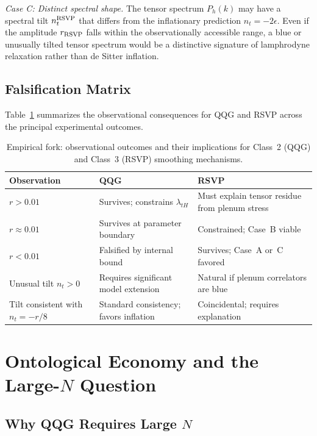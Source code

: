 \documentclass[12pt, a4paper]{article}
\newcommand{\rRSVP}{r_{\rm RSVP}}
\newcommand{\Ph}{P_h}
\begin{document}
\textit{Case C: Distinct spectral shape.} The tensor spectrum $\Ph(k)$ may have a
spectral tilt $n_t^{\rm RSVP}$ that differs from the inflationary prediction
$n_t = -2\epsilon$. Even if the amplitude $\rRSVP$ falls within the observationally
accessible range, a blue or unusually tilted tensor spectrum would be a distinctive
signature of lamphrodyne relaxation rather than de Sitter inflation.

\subsection{Falsification Matrix}

Table~\ref{tab:fork} summarizes the observational consequences for QQG and RSVP
across the principal experimental outcomes.

\begin{table}[h]
\centering
\caption{Empirical fork: observational outcomes and their implications for
Class~2 (QQG) and Class~3 (RSVP) smoothing mechanisms.}
\label{tab:fork}
\begin{tabular}{>{\raggedright}p{5cm} p{4cm} p{4cm}}
\toprule
\textbf{Observation} & \textbf{QQG} & \textbf{RSVP} \\
\midrule
$r > 0.01$ & Survives; constrains $\lambda_{tH}$ & Must explain tensor residue
from plenum stress \\[4pt]
$r \approx 0.01$ & Survives at parameter boundary & Constrained; Case~B viable \\[4pt]
$r < 0.01$ & Falsified by internal bound & Survives; Case~A or~C favored \\[4pt]
Unusual tilt $n_t > 0$ & Requires significant model extension & Natural if plenum
correlators are blue \\[4pt]
Tilt consistent with $n_t = -r/8$ & Standard consistency; favors inflation &
Coincidental; requires explanation \\
\bottomrule
\end{tabular}
\end{table}

\section{Ontological Economy and the Large-\texorpdfstring{$N$}{N} Question}
\label{sec:economy}

\subsection{Why QQG Requires Large $N$}
\end{document}
